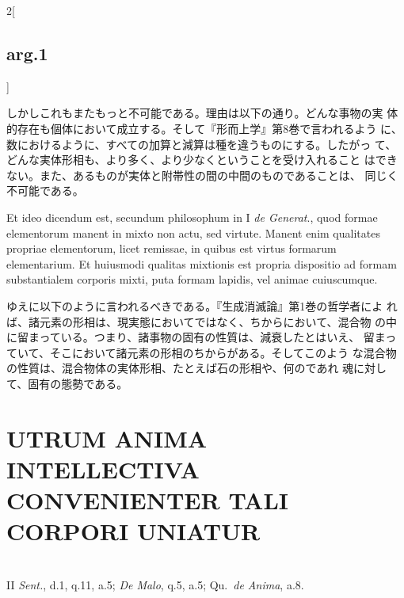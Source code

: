 \documentclass[paper=a4paper,fontsize=10pt,jafontsize=9pt,titlepage]{jlreq}
\begin{document}
\begin{paracol}{2}[\subsection{arg.1}]
\switchcolumn

 しかしこれもまたもっと不可能である。理由は以下の通り。どんな事物の実
 体的存在も個体において成立する。そして『形而上学』第8巻で言われるよう
 に、数におけるように、すべての加算と減算は種を違うものにする。したがっ
 て、どんな実体形相も、より多く、より少なくということを受け入れること
 はできない。また、あるものが実体と附帯性の間の中間のものであることは、
 同じく不可能である。
 
\switchcolumn*


Et ideo dicendum est, secundum philosophum in I {\itshape de
Generat}., quod formae elementorum manent in mixto non actu, sed
virtute. Manent enim qualitates propriae elementorum, licet remissae,
in quibus est virtus formarum elementarium. Et huiusmodi qualitas
mixtionis est propria dispositio ad formam substantialem corporis
mixti, puta formam lapidis, vel animae cuiuscumque.

 \switchcolumn

 ゆえに以下のように言われるべきである。『生成消滅論』第1巻の哲学者によ
 れば、諸元素の形相は、現実態においてではなく、ちからにおいて、混合物
 の中に留まっている。つまり、諸事物の固有の性質は、減衰したとはいえ、
 留まっていて、そこにおいて諸元素の形相のちからがある。そしてこのよう
 な混合物の性質は、混合物体の実体形相、たとえば石の形相や、何のであれ
 魂に対して、固有の態勢である。

\end{paracol}
\newpage
{}
\section{UTRUM ANIMA INTELLECTIVA CONVENIENTER TALI CORPORI UNIATUR}
\\
{\footnotesize II {\itshape Sent.}, d.1, q.11, a.5; {\itshape De Malo}, q.5,
a.5; Qu.~{\itshape de Anima}, a.8.}\\
\end{document}
